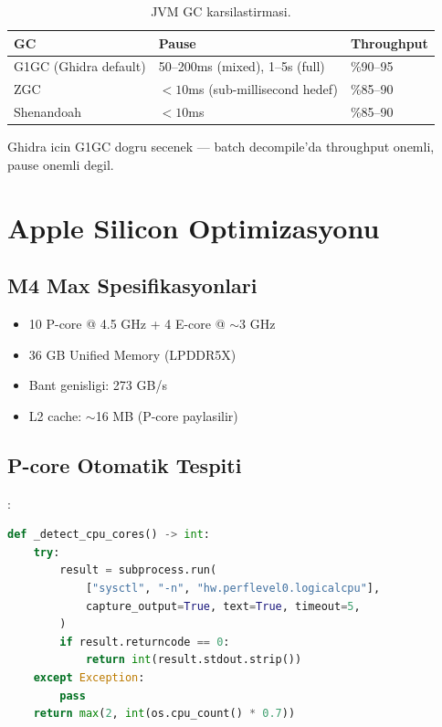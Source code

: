 \begin{table}[ht]
\centering
\begin{tabular}{lll}
\toprule
\textbf{\color{sectioncyan}GC} & \textbf{\color{sectioncyan}Pause} & \textbf{\color{sectioncyan}Throughput} \\
\midrule
G1GC (Ghidra default) & 50--200ms (mixed), 1--5s (full) & \%90--95 \\
ZGC & $< 10$ms (sub-millisecond hedef) & \%85--90 \\
Shenandoah & $< 10$ms & \%85--90 \\
\bottomrule
\end{tabular}
\caption{JVM GC karsilastirmasi.}
\end{table}

Ghidra icin G1GC dogru secenek --- batch decompile'da throughput onemli, pause onemli degil.


\section{Apple Silicon Optimizasyonu}
\label{sec:apple-deep}

\subsection{M4 Max Spesifikasyonlari}

\begin{itemize}
\item 10 P-core @ 4.5 GHz + 4 E-core @ $\sim$3 GHz
\item 36 GB Unified Memory (LPDDR5X)
\item Bant genisligi: 273 GB/s
\item L2 cache: $\sim$16 MB (P-core paylasilir)
\end{itemize}

\subsection{P-core Otomatik Tespiti}

:

\begin{lstlisting}[language=Python]
def _detect_cpu_cores() -> int:
    try:
        result = subprocess.run(
            ["sysctl", "-n", "hw.perflevel0.logicalcpu"],
            capture_output=True, text=True, timeout=5,
        )
        if result.returncode == 0:
            return int(result.stdout.strip())
    except Exception:
        pass
    return max(2, int(os.cpu_count() * 0.7))
\end{lstlisting}

